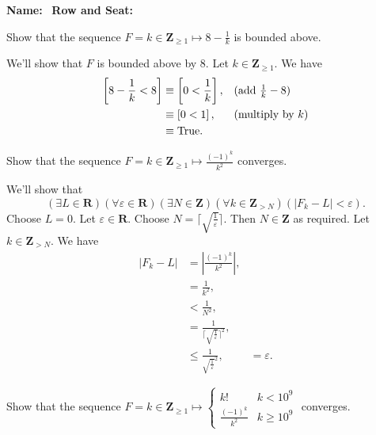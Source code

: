 \documentclass[12pt, fleqn, answers]{exam}
\newcommand{\reals}{\mathbf{R}}
\newcommand{\integers}{\mathbf{Z}}
\newcommand{\True}{\mathrm{True}}
\begin{document}
\large
\vspace{0.1in}
\noindent{}
{\bf Name:}\hrulefill\
\noindent {}
{\bf Row and Seat:}\hrulefill\

\vspace{0.1in}

\small
\normalsize
\begin{questions}

\question Show that the sequence $F = k \in \integers_{\geq 1} \mapsto 8 - \frac{1}{k}$ is
bounded above.
\begin{solution}We'll show that $F$ is bounded above by 8. Let $k \in \integers_{\geq 1} $. We have
\begin{align*}
 \left[ 8 - \frac{1}{k} < 8 \right] &\equiv \left[  0 <  \frac{1}{k} \right], && \mbox{(add $ \frac{1}{k} -8$)} \\
                                               & \equiv \left[  0 < 1 \right], && \mbox{(multiply by $k$)} \\
  &\equiv \True.
\end{align*}

\end{solution}
\question Show that the sequence $F = k \in \integers_{\geq 1} \mapsto \frac{(-1)^k}{k^2}$ converges.
\begin{solution} We'll show that
\begin{equation}
 \left(\exists L \in \reals \right)
 \left(\forall \varepsilon \in \reals\right)
 \left(\exists N \in \integers\right)
 \left(\forall k \in \integers_{>N} \right)
 \left(|F_k - L | < \varepsilon\right).
\end{equation}
Choose $L = 0$. Let  $\varepsilon \in \reals$. Choose $N =  \lceil \sqrt{\frac{1}{\varepsilon}} \rceil $. 
Then $N \in \integers$ as required.  Let $k \in \integers_{> N}$. We have
\begin{align*}
   |F_k -L | &= |\frac{(-1)^k}{k^2}|, \\
                 &= \frac{1}{k^2}, \\
                 &< \frac{1}{N^2}, \\
                 &=  \frac{1}{\lceil \sqrt{\frac{1}{\varepsilon}} \rceil^2}, \\
                 &\leq \frac{1}{\sqrt{\frac{1}{\varepsilon}}^2}, 
                 &= \varepsilon.
\end{align*}
\end{solution}
\question Show that the sequence $F = k \in \integers_{\geq 1} \mapsto \begin{cases} k! & k < 10^9 \\
\frac{(-1)^k}{k^2} & k \geq 10^9 \end{cases}$ converges.


\end{questions}
\end{document}
